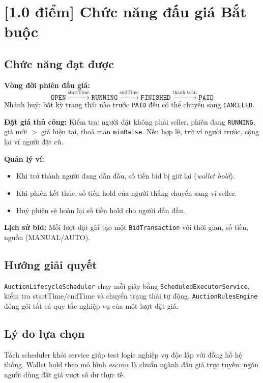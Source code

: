 \documentclass[12pt,a4paper]{article}
\newcommand{\score}[1]{\textbf{[#1 điểm]}}
\newcommand{\mandatory}{\textcolor{mandatorycolor}{\textbf{Bắt buộc}}}
\newcommand{\filepath}[1]{\texttt{\small #1}}
\begin{document}
\section{\score{1.0} Chức năng đấu giá \hfill \mandatory}

\subsection*{Chức năng đạt được}

\textbf{Vòng đời phiên đấu giá:}
\[
\texttt{OPEN} \xrightarrow{\text{startTime}} \texttt{RUNNING} \xrightarrow{\text{endTime}} \texttt{FINISHED} \xrightarrow{\text{thanh toán}} \texttt{PAID}
\]
Nhánh huỷ: bất kỳ trạng thái nào trước \texttt{PAID} đều có thể chuyển sang \texttt{CANCELED}.

\textbf{Đặt giá thủ công:} Kiểm tra: người đặt không phải seller, phiên đang \texttt{RUNNING}, giá mới $>$ giá hiện tại, thoả mãn \texttt{minRaise}. Nếu hợp lệ, trừ ví người trước, cộng lại ví người đặt cũ.

\textbf{Quản lý ví:}
\begin{itemize}[leftmargin=1.5em]
  \item Khi trở thành người đang dẫn đầu, số tiền bid bị giữ lại (\textit{wallet hold}).
  \item Khi phiên kết thúc, số tiền hold của người thắng chuyển sang ví seller.
  \item Huỷ phiên sẽ hoàn lại số tiền hold cho người dẫn đầu.
\end{itemize}

\textbf{Lịch sử bid:} Mỗi lượt đặt giá tạo một \texttt{BidTransaction} với thời gian, số tiền, nguồn (MANUAL/AUTO).

\subsection*{Hướng giải quyết}
\filepath{AuctionLifecycleScheduler} chạy mỗi giây bằng \texttt{ScheduledExecutorService}, kiểm tra startTime/endTime và chuyển trạng thái tự động. \filepath{AuctionRulesEngine} đóng gói tất cả quy tắc nghiệp vụ của một lượt đặt giá.

\subsection*{Lý do lựa chọn}
Tách scheduler khỏi service giúp test logic nghiệp vụ độc lập với đồng hồ hệ thống. Wallet hold theo mô hình \textit{escrow} là chuẩn ngành đấu giá trực tuyến: ngăn người dùng đặt giá vượt số dư thực tế.
\end{document}
